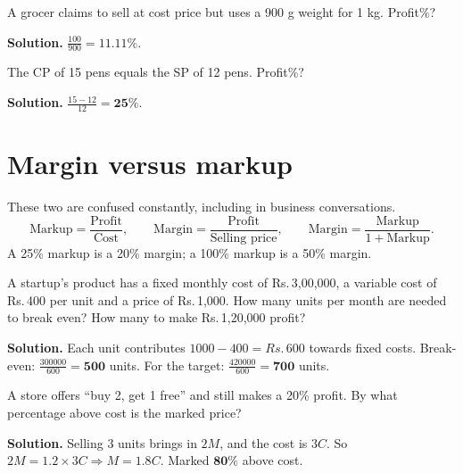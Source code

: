 \documentclass[11pt,a4paper,openany]{report}
\newcommand{\Rs}{Rs.\,}
\begin{document}
\begin{example}
A grocer claims to sell at cost price but uses a 900 g weight for 1 kg. Profit\%?

\textbf{Solution.} $\frac{100}{900}=\mathbf{11.11\%}$.
\end{example}

\begin{example}
The CP of 15 pens equals the SP of 12 pens. Profit\%?

\textbf{Solution.} $\frac{15-12}{12}=\mathbf{25\%}$.
\end{example}
\section{Margin versus markup}
These two are confused constantly, including in business conversations.
\[\text{Markup}=\frac{\text{Profit}}{\text{Cost}},\qquad\text{Margin}=\frac{\text{Profit}}{\text{Selling price}},\qquad\text{Margin}=\frac{\text{Markup}}{1+\text{Markup}}.\]
A 25\% markup is a 20\% margin; a 100\% markup is a 50\% margin.

\begin{example}
A startup's product has a fixed monthly cost of \Rs3,00,000, a variable cost of \Rs400 per unit and a price of \Rs1,000. How many units per month are needed to break even? How many to make \Rs1,20,000 profit?

\textbf{Solution.} Each unit contributes $1000-400=\Rs600$ towards fixed costs. Break-even: $\frac{300000}{600}=\mathbf{500}$ units. For the target: $\frac{420000}{600}=\mathbf{700}$ units.
\end{example}

\begin{example}
A store offers ``buy 2, get 1 free'' and still makes a 20\% profit. By what percentage above cost is the marked price?

\textbf{Solution.} Selling 3 units brings in $2M$, and the cost is $3C$. So $2M=1.2\times3C\Rightarrow M=1.8C$. Marked $\mathbf{80\%}$ above cost.
\end{example}
\end{document}
